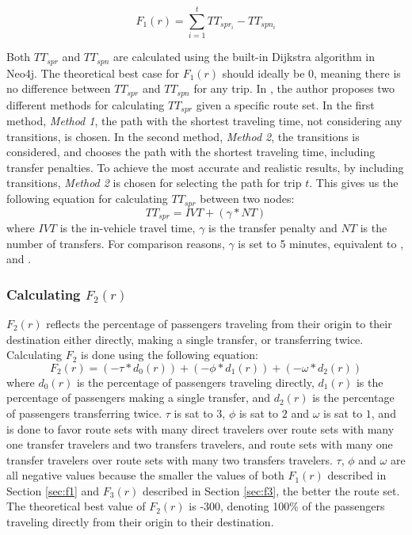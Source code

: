 $$F_{1}(r) = \sum\limits^{t}_{i=1}TT_{spr_i}-TT_{spn_i}$$

Both $TT_{spr}$ and $TT_{spn}$ are calculated using the built-in Dijkstra algorithm in Neo4j. The theoretical best case for $F_{1}(r)$ should ideally be 0, meaning there is no difference between $TT_{spr}$ and $TT_{spn}$ for any trip. In \citet{mandl79}, the author proposes two different methods for calculating $TT_{spr}$ given a specific route set. In the first method, \textit{Method 1}, the path with the shortest traveling time, not considering any transitions, is chosen. In the second method, \textit{Method 2}, the transitions is considered, and chooses the path with the shortest traveling time, including transfer penalties. To achieve the most accurate and realistic results, by including transitions,  \textit{Method 2} is chosen for selecting the path for trip $t$. This gives us the following equation for calculating $TT_{spr}$ between two nodes: 
\newline
$$TT_{spr} = IVT + (\gamma*NT)$$
\newline
where $IVT$ is the in-vehicle travel time, $\gamma$ is the transfer penalty and $NT$ is the number of transfers. For comparison reasons, $\gamma$ is set to 5 minutes, equivalent to \citet{kechagiopoulos14}, \citet{nikolic14} and \citet{mandl79}. %

\subsubsection{Calculating $F_{2}(r)$}
\label{sec:f2}
$F_{2}(r)$ reflects the percentage of passengers traveling from their origin to their destination either directly, making a single transfer, or transferring twice. Calculating $F_{2}$ is done using the following equation: 
\newline
$$F_2(r) = (-\tau*d_0(r)) + (-\phi*d_1(r)) + (-\omega*d_2(r))$$
\newline
where $d_0(r)$ is the percentage of passengers traveling directly, $d_1(r)$ is the percentage of passengers making a single transfer, and $d_2(r)$ is the percentage of passengers transferring twice. $\tau$ is sat to $3$, $\phi$ is sat to $2$ and $\omega$ is sat to $1$, and is done to favor route sets with many direct travelers over route sets with many one transfer travelers and two transfers travelers, and route sets with many one transfer travelers over route sets with many two transfers travelers. $\tau$, $\phi$ and $\omega$ are all negative values because the smaller the values of both $F_{1}(r)$ described in Section \vref{sec:f1} and $F_{3}(r)$ described in Section \vref{sec:f3}, the better the route set. The theoretical best value of $F_{2}(r)$ is -300, denoting 100\% of the passengers traveling directly from their origin to their destination. 

